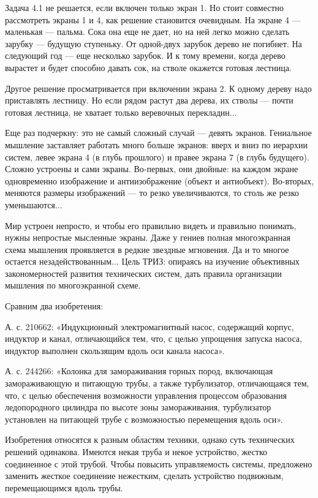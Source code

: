 Задача  4.1  не  решается,  если  включен только  экран  1.  Но  стоит
совместно рассмотреть экраны 1 и  4, как решение становится очевидным.
На экране  4 — маленькая  — пальма.  Сока она еще  не дает, но  на ней
легко можно сделать зарубку — будущую ступеньку. От одной-двух зарубок
дерево не погибнет. На следующий год — еще несколько зарубок. И к тому
времени, когда дерево вырастет и  будет способно давать сок, на стволе
окажется готовая лестница.

Другое решение просматривается при включении экрана 2. К одному дереву
надо приставлять лестницу. Но если  рядом растут два дерева, их стволы
— почти готовая лестница, не хватает только веревочных перекладин...


Еще  раз подчеркну:  это не  самый  сложный случай  — девять  экранов.
Гениальное мышление заставляет работать  много больше экранов: вверх и
вниз  по  иерархии  систем,  левее  экрана  4  (в  глубь  прошлого)  и
правее экрана  7 (в  глубь будущего). Сложно  устроены и  сами экраны.
Во-первых, они  двойные: на  каждом экране одновременно  изображение и
антиизображение  (объект и  антиобъект).  Во-вторых, меняются  размеры
изображений — то резко увеличиваются, то столь же резко уменьшаются...

Мир  устроен  непросто,  и  чтобы его  правильно  видеть  и  правильно
понимать,  нужны  непростые мысленные  экраны.  Даже  у гениев  полная
многоэкранная схема мышления проявляется  в редкие звездные мгновения.
Да и  то многое остается  незадействованным... Цель ТРИЗ:  опираясь на
изучение объективных закономерностей развития технических систем, дать
правила организации мышления по многоэкранной схеме.


Сравним два изобретения:

А. с. 210662: «Индукционный электромагнитный насос, содержащий корпус,
индуктор и  канал, отличающийся  тем, что,  с целью  упрощения запуска
насоса, индуктор выполнен скользящим вдоль оси канала насоса».

А.  с. 244266:  «Колонка  для замораживания  горных пород,  включающая
замораживающую и  питающую трубы,  а также  турбулизатор, отличающаяся
тем,  что,  с  целью   обеспечения  возможности  управления  процессом
образования  ледопородного  цилиндра  по  высоте  зоны  замораживания,
турбулизатор установлен  на питающей трубе с  возможностью перемещения
вдоль оси».

Изобретения  относятся   к  разным   областям  техники,   однако  суть
технических решений одинакова. Имеются некая труба и некое устройство,
жестко  соединенное  с  этой   трубой.  Чтобы  повысить  управляемость
системы,  предложено заменить  жесткое  соединение нежестким,  сделать
устройство подвижным, перемещающимся вдоль трубы.


